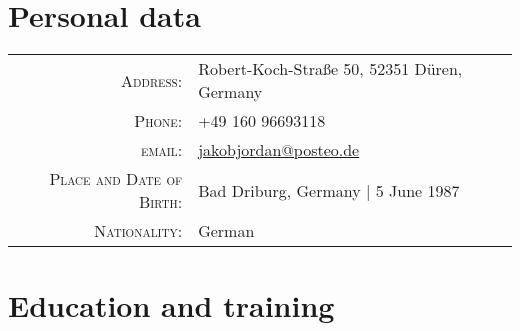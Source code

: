 \documentclass[a4paper,10pt]{article}
\begin{document}
\pagestyle{empty}

\par{\bigskip\par}

\section{Personal data}

\begin{longtable}{rl}
\textsc{Address:} & Robert-Koch-Stra\ss e 50, 52351 D\"uren, Germany \\
\textsc{Phone:} & +49 160 96693118\\
\textsc{email:} & \href{mailto:jakobjordan@posteo.de}{jakobjordan@posteo.de} \\
\textsc{Place and Date of Birth:} & Bad Driburg, Germany | 5 June 1987 \\
\textsc{Nationality:} & German
\end{longtable}

\section{Education and training}
\end{document}
